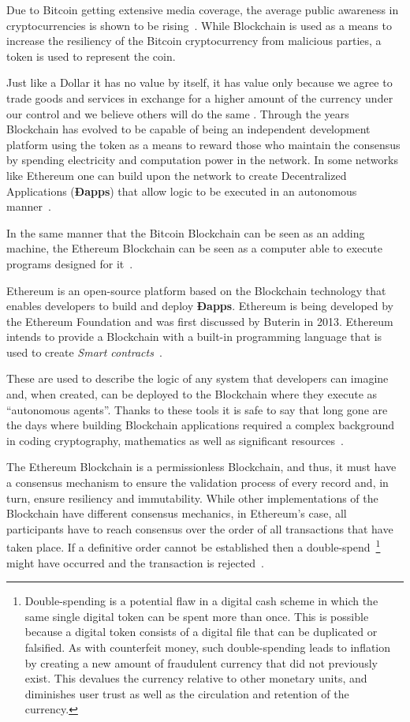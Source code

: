 Due to Bitcoin getting extensive media coverage, the average public awareness
in cryptocurrencies is shown to be rising~\cite{BitAwareness2017}. While
Blockchain is used as a means to increase the resiliency of the Bitcoin
cryptocurrency from malicious parties, a token is used to represent the coin. 

Just like a Dollar it has no value by itself, it has value only because we
agree to trade goods and services in exchange for a higher amount of the
currency under our control and we believe others will do the same
\cite{aliessi2016}. Through the years Blockchain has evolved to be capable of
being an independent development platform using the token as a means to reward
those who maintain the consensus by spending electricity and computation power
in the network. In some networks like Ethereum one can build upon the network
to create Decentralized Applications (\textbf{Ðapps}) that allow logic to be
executed in an autonomous manner~\cite{Wood2017}. 

In the same manner that the Bitcoin Blockchain can be seen as an adding
machine, the Ethereum Blockchain can be seen as a computer able to execute
programs designed for it~\cite{Wood2015}.

Ethereum is an open-source platform based on the Blockchain technology that
enables developers to build and deploy \textbf{Ðapps}. Ethereum is being
developed by the Ethereum Foundation and was first discussed by Buterin in
2013.  Ethereum intends to provide a Blockchain with a built-in programming
language that is used to create \textit{Smart contracts}~\cite{Wood2017}.

These are used to describe the logic of any system that developers can imagine
and, when created, can be deployed to the Blockchain where they execute as
“autonomous agents”.  Thanks to these tools it is safe to say that long gone
are the days where building Blockchain applications required a complex
background in coding cryptography, mathematics as well as significant
resources~\cite{Wood2017,BlockGeeks2017}.

The Ethereum Blockchain is a permissionless Blockchain, and thus, it must have
a consensus mechanism to ensure the validation process of every record and, in
turn, ensure resiliency and immutability. While other implementations of the
Blockchain have different consensus mechanics, in Ethereum’s case, all
participants have to reach consensus over the order of all transactions that
have taken place. If a definitive order cannot be established then a
double-spend~\footnote{Double-spending is a potential flaw in a digital cash
scheme in which the same single digital token can be spent more than once.
This is possible because a digital token consists of a digital file that can be
duplicated or falsified. As with counterfeit money, such double-spending leads
to inflation by creating a new amount of fraudulent currency that did not
previously exist. This devalues the currency relative to other monetary units,
and diminishes user trust as well as the circulation and retention of the
currency.} might have occurred and the transaction is rejected~\cite{Wood2017}.

